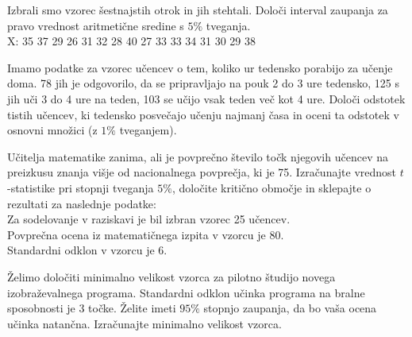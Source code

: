 \begin{Vaje}{1}
    Izbrali smo vzorec šestnajstih otrok in jih stehtali. Določi interval zaupanja za pravo vrednost aritmetične sredine s $5\%$ tveganja.\\
    X: 35 37 29	26 31 32 28	40 27 33 33	34 31 30 29	38
\end{Vaje}
\begin{Vaje}{2}
Imamo podatke za vzorec učencev o tem, koliko ur tedensko porabijo za učenje doma. 78 jih je odgovorilo, da se pripravljajo na pouk 2 do 3 ure tedensko, 125 s jih uči 3 do 4 ure na teden, 103 se učijo vsak teden več kot 4 ure. Določi odstotek tistih učencev, ki tedensko posvečajo učenju najmanj časa in oceni ta odstotek v osnovni množici (z $1\%$ tveganjem).
\end{Vaje}
\begin{Vaje}{3}
Učitelja matematike zanima, ali je povprečno število točk njegovih učencev na preizkusu znanja višje od nacionalnega povprečja, ki je 75. Izračunajte vrednost $t$-statistike pri stopnji tveganja $5 \%$, določite kritično območje in sklepajte o rezultati za naslednje podatke:\\
Za sodelovanje v raziskavi je bil izbran vzorec 25 učencev.\\
Povprečna ocena iz matematičnega izpita v vzorcu je 80.\\
Standardni odklon v vzorcu je 6.
\end{Vaje}
\begin{Vaje}{4}
    Želimo določiti minimalno velikost vzorca za pilotno študijo novega izobraževalnega programa. Standardni odklon učinka programa na bralne sposobnosti je 3 točke. Želite imeti $95\%$ stopnjo zaupanja, da bo vaša ocena učinka natančna. Izračunajte minimalno velikost vzorca.
\end{Vaje}